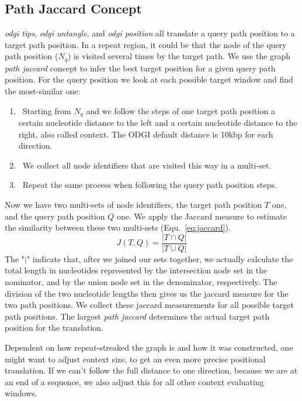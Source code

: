 \documentclass{bioinfo}
\begin{document}
\subsection{Path Jaccard Concept}
\textit{odgi tips}, \textit{odgi untangle}, and \textit{odgi position} all translate a query path position to a target path position. In a repeat region, it could be that the node of the query path position ($N_q$) is visited several times by the target path. We use the graph \textit{path jaccard} concept to infer the best target position for a given query path position. For the query position we look at each possible target window and find the most-similar one:
\begin{enumerate}
	\item~Starting from $N_q$ and we follow the steps of one target path position a certain nucleotide distance to the left and a certain nucleotide distance to the right, also called context. The ODGI default distance is 10kbp for each direction. 
	\item~We collect all node identifiers that are visited this way in a multi-set.
	\item~Repeat the same process when following the query path position steps.
\end{enumerate}
Now we have two multi-sets of node identifiers, the target path position $T$ one, and the query path position $Q$ one. We apply the Jaccard measure to estimate the similarity between these two multi-sets (Equ.~\ref{eq:jaccard}).
\begin{equation}
	J(T,Q)=\frac{|T\cap Q|}{|T\cup Q|}
	\label{eq:jaccard}
\end{equation}
The "$|$" indicate that, after we joined our sets together, we actually calculate the total length in nucleotides represented by the intersection node set in the nominator, and by the union node set in the denominator, respectively. The division of the two nucleotide lengths then gives us the jaccard measure for the two path positions.
We collect these jaccard measurements for all possible target path positions. The largest \textit{path jaccard} determines the actual target path position for the translation.

Dependent on how repeat-streaked the graph is and how it was constructed, one might want to adjust context size, to get an even more precise positional translation. If we can't follow the full distance to one direction, because we are at an end of a sequence, we also adjust this for all other context evaluating windows.
\end{document}
